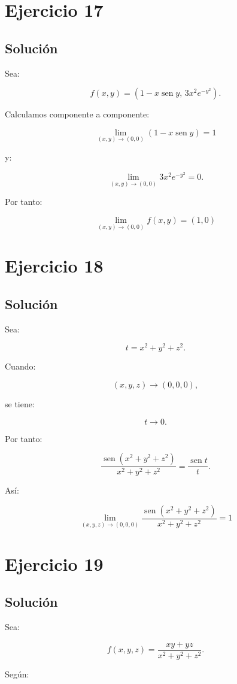 \documentclass[11pt,a4paper]{article}
\newcommand{\sen}{\operatorname{sen}}
\begin{document}
\section{Ejercicio 17}
\subsection{Solución}

Sea:

\[
f(x,y)
=
\left(
1-x\sen y,\,
3x^2e^{-y^2}
\right).
\]

Calculamos componente a componente:

\[
\lim_{(x,y)\to(0,0)}
(1-x\sen y)
=
1
\]

y:

\[
\lim_{(x,y)\to(0,0)}
3x^2e^{-y^2}
=
0.
\]

Por tanto:

\[
\boxed{
\lim_{(x,y)\to(0,0)}f(x,y)
=
(1,0)
}
\]

\section{Ejercicio 18}
\subsection{Solución}

Sea:

\[
t=x^2+y^2+z^2.
\]

Cuando:

\[
(x,y,z)\to(0,0,0),
\]

se tiene:

\[
t\to0.
\]

Por tanto:

\[
\frac{\sen(x^2+y^2+z^2)}
{x^2+y^2+z^2}
=
\frac{\sen t}{t}.
\]

Así:

\[
\boxed{
\lim_{(x,y,z)\to(0,0,0)}
\frac{\sen(x^2+y^2+z^2)}
{x^2+y^2+z^2}
=
1
}
\]

\section{Ejercicio 19}
\subsection{Solución}

Sea:

\[
f(x,y,z)
=
\frac{xy+yz}{x^2+y^2+z^2}.
\]

Según:
\end{document}
